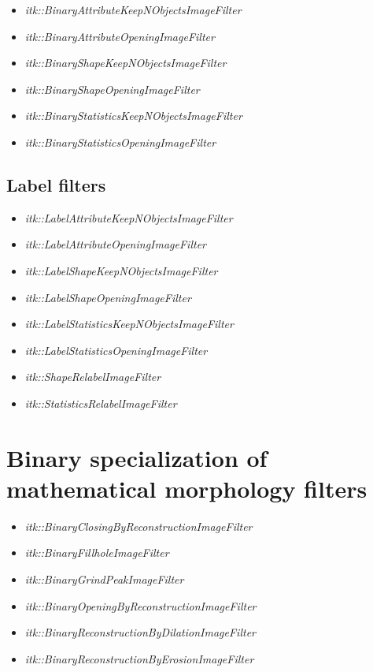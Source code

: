 \documentclass{InsightArticle}
\begin{document}
\begin{itemize}
  \item {\em itk::BinaryAttributeKeepNObjectsImageFilter}
  \item {\em itk::BinaryAttributeOpeningImageFilter}
  \item {\em itk::BinaryShapeKeepNObjectsImageFilter}
  \item {\em itk::BinaryShapeOpeningImageFilter}
  \item {\em itk::BinaryStatisticsKeepNObjectsImageFilter}
  \item {\em itk::BinaryStatisticsOpeningImageFilter}
\end{itemize}

\subsection{Label filters}

\begin{itemize}
  \item {\em itk::LabelAttributeKeepNObjectsImageFilter}
  \item {\em itk::LabelAttributeOpeningImageFilter}
  \item {\em itk::LabelShapeKeepNObjectsImageFilter}
  \item {\em itk::LabelShapeOpeningImageFilter}
  \item {\em itk::LabelStatisticsKeepNObjectsImageFilter}
  \item {\em itk::LabelStatisticsOpeningImageFilter}
  \item {\em itk::ShapeRelabelImageFilter}
  \item {\em itk::StatisticsRelabelImageFilter}
\end{itemize}

\section{Binary specialization of mathematical morphology filters}

\begin{itemize}
  \item {\em itk::BinaryClosingByReconstructionImageFilter}
  \item {\em itk::BinaryFillholeImageFilter}
  \item {\em itk::BinaryGrindPeakImageFilter}
  \item {\em itk::BinaryOpeningByReconstructionImageFilter}
  \item {\em itk::BinaryReconstructionByDilationImageFilter}
  \item {\em itk::BinaryReconstructionByErosionImageFilter}
\end{itemize}
\end{document}
